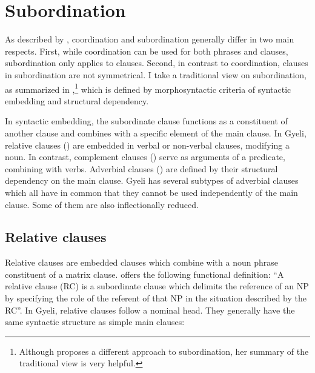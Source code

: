 \section{Subordination}
\label{sec:Sub}

As described by \citet[46-48]{haspelmath2007}, coordination and subordination generally differ in two main respects. First, while coordination can be used for both phrases and clauses, subordination only applies to clauses. Second, in contrast to coordination, clauses in subordination are not symmetrical. 
I take a traditional view on subordination, as summarized in \citet[15]{cristofaro2003},\footnote{Although \citet{cristofaro2003} proposes a different approach to subordination, her summary of the traditional view is very helpful.} which is defined by morphosyntactic criteria of syntactic embedding and structural dependency. 

In syntactic embedding, the subordinate clause functions as a constituent of another clause and combines with a specific element of the main clause. In Gyeli, relative clauses () are embedded in verbal or non-verbal clauses, modifying a noun. In contrast, complement clauses () serve as arguments of a predicate, combining with verbs. Adverbial clauses () are defined by their structural dependency on the main clause. Gyeli has several subtypes of adverbial clauses which all have in common that they cannot be used independently of the main clause. Some of them are also inflectionally reduced.













\subsection{Relative clauses}
\label{sec:Relativeclauses}

Relative clauses are embedded clauses which combine with a noun phrase constituent of a matrix clause. \citet[206]{andrews2007} offers the following functional definition:
``A relative clause (RC) is a subordinate clause which delimits the reference of an NP by specifying the role of the referent of that NP in the situation described by the RC''. 
In Gyeli, relative clauses follow a nominal head. They generally have the same syntactic structure as simple main clauses:

